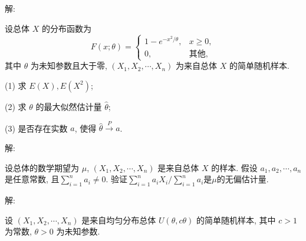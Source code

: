 \documentclass[standard]{ExBook}
\begin{document}
\begin{qitems}
\vspace{-5em}

    \begin{bbox}
解: 
    \end{bbox}

\vspace{-5em}

    \begin{bbox}
    \begin{shaded}
        \qitem
设总体 \(X\) 的分布函数为
\[F(x; \theta) =
\begin{cases} 
1 - e^{-x^2/\theta}, & x \geq 0, \\
0, & \text{其他},
\end{cases}\]
其中 \(\theta\) 为未知参数且大于零, \((X_1, X_2, \cdots, X_n)\) 为来自总体 \(X\) 的简单随机样本.

(1) 求 \(E(X), E(X^2)\);

(2) 求 \(\theta\) 的最大似然估计量 \(\hat{\theta}\);

(3) 是否存在实数 \(a\), 使得 \(\hat{\theta} \overset{P}{\longrightarrow} a\).
    \end{shaded}
    \end{bbox}

\vspace{-5em}

    \begin{bbox}
解: 
    \end{bbox}

\vspace{-5em}

    \begin{bbox}
    \begin{shaded}
        \qitem
设总体的数学期望为 \(\mu\), \((X_1, X_2, \cdots, X_n)\) 是来自总体 \(X\) 的样本. 假设 \(a_1, a_2, \cdots, a_n\) 是任意常数, 且\(\displaystyle\sum\limits_{i=1}^n a_i \neq 0\). 验证\(\displaystyle\sum\limits_{i=1}^n a_i X_i \Big/ \displaystyle\sum\limits_{i=1}^n a_i\)是\(\mu\)的无偏估计量.
    \end{shaded}
    \end{bbox}

\vspace{-5em}

    \begin{bbox}
解: 
    \end{bbox}

\vspace{-5em}

    \begin{bbox}
    \begin{shaded}
        \qitem
设 \((X_1, X_2, \cdots, X_n)\) 是来自均匀分布总体 \(U(\theta, c\theta)\) 的简单随机样本, 其中 \(c > 1\) 为常数, \(\theta > 0\) 为未知参数.


\end{shaded}
\end{bbox}
\end{qitems}
\end{document}
